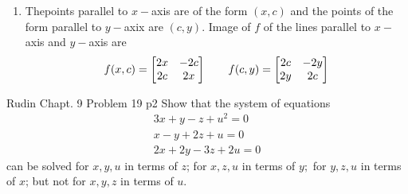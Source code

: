 \documentclass[a4paper, 11pt]{article}
\begin{document}
{\begin{enumerate}[label=(\alph*)]
\begin{align*}
		      \end{align*}Therefore $$g'\lt(-\frac{\pi^2}{9},0\rt)=\lt[ \begin{matrix}
					      0 & \frac{3}{2\pi} \\ \frac{3}{2\pi} & 0
				      \end{matrix} \rt]$$Now we previously determined $f'(x,y)=\lt[ \begin{matrix}
					      2x & -2y \\ 2y & 2x
				      \end{matrix} \rt]$Therefore \[
			      f'(\textbf{a})\circ g'(\textbf{b})=\lt[ \begin{matrix}
					      0 & -\frac{2\pi}{3} \\ \frac{2\pi}{3} & 0 \end{matrix}\rt] \lt[ \begin{matrix}
					      0 & \frac{3}{2\pi} \\ -\frac{3}{2\pi} & 0 \end{matrix}\rt] = \lt[ \begin{matrix}
					      1 & 0 \\ 0 & 1\end{matrix}\rt]
		      \]
		\item Thepoints parallel to $x-$axis are of the form $(x,c)$ and the points of the form parallel to $y-$axix are $(c,y)$. Image of $f$ of the lines parallel to $x-$ axis and $y-$axis are $$f(x,c)=\left[ \begin{matrix}2x & -2c\\ 2c & 2x\end{matrix}\right]\qquad f(c,y)=\left[ \begin{matrix}2c & -2y\\ 2y& 2c\end{matrix}\right]$$
	\end{enumerate}
}



\begin{problem}{%
Rudin Chapt. 9 Problem 19
}{p2%
}
Show that the system of equations
$$
	\begin{array}{r}
		3 x+y-z+u^{2}=0 \\
		x-y+2 z+u=0     \\
		2 x+2 y-3 z+2 u=0
	\end{array}
$$
can be solved for $x, y, u$ in terms of $z$; for $x, z, u$ in terms of $y ;$ for $y, z, u$ in terms of $x$; but not for $x, y, z$ in terms of $u$.
\end{problem}
\end{document}
